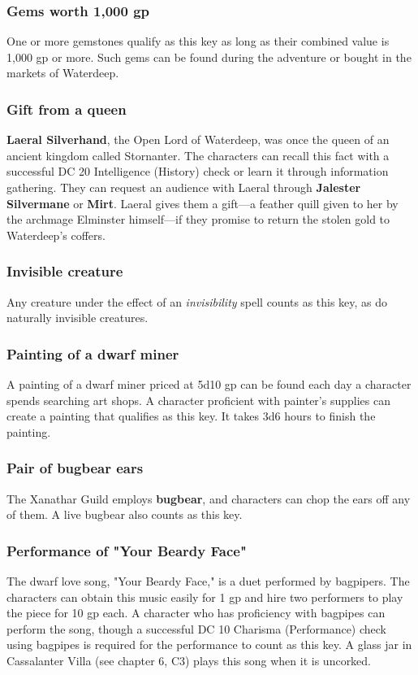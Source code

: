 \documentclass[10pt,a4paper,twoside,twocolumn,openany,nodeprecatedcode]{dndbook}
\begin{document}
\subsubsection{Gems worth 1,000 gp}
One or more gemstones qualify as this key as long as their combined value is 1,000 gp or more. Such gems can be found during the adventure or bought in the markets of Waterdeep.
\subsubsection{Gift from a queen}
\textbf{Laeral Silverhand}, the Open Lord of Waterdeep, was once the queen of an ancient kingdom called Stornanter. The characters can recall this fact with a successful DC 20 Intelligence (History) check or learn it through information gathering. They can request an audience with Laeral through \textbf{Jalester Silvermane} or \textbf{Mirt}. Laeral gives them a gift—a feather quill given to her by the archmage Elminster himself—if they promise to return the stolen gold to Waterdeep's coffers.
\subsubsection{Invisible creature}
Any creature under the effect of an \textit{invisibility} spell counts as this key, as do naturally invisible creatures.
\subsubsection{Painting of a dwarf miner}
A painting of a dwarf miner priced at 5d10 gp can be found each day a character spends searching art shops. A character proficient with painter's supplies can create a painting that qualifies as this key. It takes 3d6 hours to finish the painting.
\subsubsection{Pair of bugbear ears}
The Xanathar Guild employs \textbf{bugbear}, and characters can chop the ears off any of them. A live bugbear also counts as this key.
\subsubsection{Performance of "Your Beardy Face"}
The dwarf love song, "Your Beardy Face," is a duet performed by bagpipers. The characters can obtain this music easily for 1 gp and hire two performers to play the piece for 10 gp each. A character who has proficiency with bagpipes can perform the song, though a successful DC 10 Charisma (Performance) check using bagpipes is required for the performance to count as this key. A glass jar in Cassalanter Villa (see chapter 6, C3) plays this song when it is uncorked.
\end{document}
